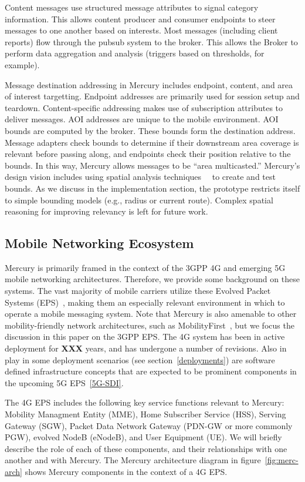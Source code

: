 Content messages use structured 
message attributes to signal category information. This allows content
producer and consumer endpoints to steer messages to one another based
on interests. Most messages (including client reports) flow through
the pubsub system to the broker. This allows the Broker to perform
data aggregation and analysis (triggers based on thresholds, for
example).

Message destination addressing in Mercury includes endpoint, content,
and area of interest targetting. Endpoint addresses are primarily used
for session setup and teardown. Content-specific addressing makes use
of subscription attributes to deliver messages. AOI addresses are
unique to the mobile environment. AOI bounds are computed by the
broker. These bounds form the destination address. Message adapters
check bounds to determine if their downstream area coverage is
relevant before passing along, and endpoints check their position
relative to the bounds.  In this way, Mercury allows messages to be
``area multicasted.''  Mercury's design vision includes using spatial
analysis techniques~\cite{sp-an1}~\cite{sp-an2} to create and test
bounds.  As we discuss in the implementation section, the prototype
restricts itself to simple bounding models (e.g., radius or current
route). Complex spatial reasoning for improving relevancy is left for
future work.

\subsection{Mobile Networking Ecosystem}

Mercury is primarily framed in the context of the 3GPP 4G and emerging
5G mobile networking architectures. Therefore, we provide some
background on these systems.  The vast majority of mobile carriers
utilize these Evolved Packet Systems (EPS)~\cite{mobile-stats}, making
them an especially relevant environment in which to operate a mobile
messaging system.  Note that Mercury is also amenable to other
mobility-friendly network architectures, such as
MobilityFirst~\cite{mobility-first}, but we focus the discussion in
this paper on the 3GPP EPS.  The 4G system has been in active
deployment for {\bf XXX} years, and has undergone a number of
revisions. Also in play in some deployment scenarios (see
section~\ref{deployments}) are software defined infrastructure
concepts that are expected to be prominent components in the upcoming
5G EPS~\ref{5G-SDI}.

The 4G EPS includes the following key service functions relevant to
Mercury: Mobility Managment Entity (MME), Home Subscriber Service
(HSS), Serving Gateway (SGW), Packet Data Network Gateway (PDN-GW or
more commonly PGW), evolved NodeB (eNodeB), and User Equipment (UE).
We will briefly describe the role of each of these components, and
their relationships with one another and with Mercury. The Mercury
architecture diagram in figure~\ref{fig:merc-arch} shows Mercury
components in the context of a 4G EPS.

